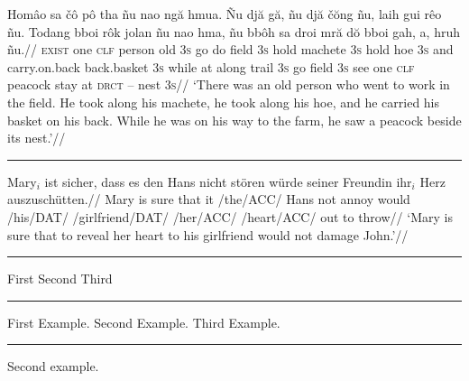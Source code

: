 \documentclass[12pt]{article}
\begin{document}
\begingroup
\ex[glhangstyle=cascade]
\let\\=\textsc
\begingl
\gla
Hom\^{a}o sa \v{c}\^{o} p\^{o} tha  \~{n}u nao ng\u{a} hmua. \~{N}u
dj\u{a} g\u{a}, \~{n}u dj\u{a} \v{c}\u{o}ng \~{n}u, laih gui r\^{e}o
\~{n}u. Todang bboi r\^{o}k jolan \~{n}u nao hma, \~{n}u bb\^{o}h sa
droi mr\u{a} d\u{o} bboi gah, a, hruh \~{n}u.//
\glb
\\{exist} one \\{clf} person old \\{3s} go do field \\{3s} hold
machete \\{3s} hold hoe \\{3s} and carry.on.back back.basket \\{3s}
while at along trail \\{3s} go field \\{3s} see one \\{clf} peacock
stay at \\{drct} -- nest \\{3s}//
\glft
`There was an old person who went to work in the field. He took
along his machete, he took along his hoe, and he carried his
basket on his back. While he was on his way to the farm, he saw a
peacock beside its nest.'//
\endgl
\xe
\endgroup
\bigskip

\filbreak\hrule\medskip

\begingroup
\ex[glhangstyle=normal,glufcloseup=.4ex,everygluf=\footnotesize]
\begingl
\gla Mary$_i$ ist sicher, dass es den Hans nicht st\"oren
   w\"urde seiner Freundin ihr$_i$ Herz auszusch\"utten.//
\glb Mary is sure that it \gluf/the/ACC/ Hans not annoy would
   \gluf/his/DAT/ \gluf/girlfriend/DAT/ \gluf/her/ACC/
   \gluf/heart/ACC/ {out to throw}//
\glft `Mary is sure that to reveal her heart to his girlfriend
would not damage John.'//
\endgl
\xe
\endgroup
\bigskip

\filbreak\hrule\medskip

\begingroup
\pex[interpartskip=0pt]
\a First
\a Second
\a Third
\xe
\endgroup
\bigskip

\filbreak\hrule\medskip

\begingroup
\pex[everylabel=\it]
\a First Example.
\a Second Example.
\a Third Example.
\xe
\endgroup
\bigskip

\filbreak\hrule\medskip

\begingroup
\ex[exno=\getref{snoopy}] Second example.\xe
\endgroup
\bigskip
\end{document}
